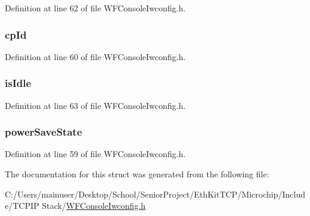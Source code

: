 Definition at line 62 of file W\+F\+Console\+Iwconfig.\+h.

\hypertarget{structt_w_f_iwconfig_cb_a1cc90f47e8f45a728abe46627fb6b067}{}
\subsubsection[{cp\+Id}]{ cp\+Id}\label{structt_w_f_iwconfig_cb_a1cc90f47e8f45a728abe46627fb6b067}


Definition at line 60 of file W\+F\+Console\+Iwconfig.\+h.

\hypertarget{structt_w_f_iwconfig_cb_a91bbb925efdef20673245a84698f105d}{}
\subsubsection[{is\+Idle}]{ is\+Idle}\label{structt_w_f_iwconfig_cb_a91bbb925efdef20673245a84698f105d}


Definition at line 63 of file W\+F\+Console\+Iwconfig.\+h.

\hypertarget{structt_w_f_iwconfig_cb_a5f0b28ce8199e905267ddcba3987c359}{}
\subsubsection[{power\+Save\+State}]{ power\+Save\+State}\label{structt_w_f_iwconfig_cb_a5f0b28ce8199e905267ddcba3987c359}


Definition at line 59 of file W\+F\+Console\+Iwconfig.\+h.



The documentation for this struct was generated from the following file\+:\begin{DoxyCompactItemize}
\item 
C\+:/\+Users/mainuser/\+Desktop/\+School/\+Senior\+Project/\+Eth\+Kit\+T\+C\+P/\+Microchip/\+Include/\+T\+C\+P\+I\+P Stack/\hyperlink{_w_f_console_iwconfig_8h}{W\+F\+Console\+Iwconfig.\+h}\end{DoxyCompactItemize}
